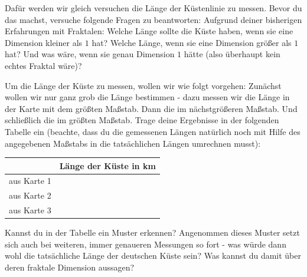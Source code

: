 \documentclass[a4paper,ngerman,12pt]{scrartcl}
\theoremstyle{definition}
\theoremstyle{plain}
\theoremstyle{remark}
\begin{document}
\begin{itemize}
	Dafür werden wir gleich versuchen die Länge der Küstenlinie zu messen. Bevor du das machst, versuche folgende Fragen zu beantworten: Aufgrund deiner bisherigen Erfahrungen mit Fraktalen: Welche Länge sollte die Küste haben, wenn sie eine Dimension kleiner als $1$ hat? Welche Länge, wenn sie eine Dimension größer als $1$ hat? Und was wäre, wenn sie genau Dimension $1$ hätte (also überhaupt kein echtes Fraktal wäre)?
	
	Um die Länge der Küste zu messen, wollen wir wie folgt vorgehen: Zunächst wollen wir nur ganz grob die Länge bestimmen - dazu messen wir die Länge in der Karte mit dem größten Maßstab. Dann die im nächstgrößeren Maßstab. Und schließlich die im größten Maßstab. Trage deine Ergebnisse in der folgenden Tabelle ein (beachte, dass du die gemessenen Längen natürlich noch mit Hilfe des angegebenen Maßstabs in die tatsächlichen Längen umrechnen musst):
	
	\begin{center}
		\renewcommand{\arraystretch}{2}
		\begin{tabular}{l||c}
			& Länge der Küste in \unit{km} \\\hline\hline
			aus Karte 1 & \\\hline
			aus Karte 2 & \\\hline
			aus Karte 3 &
		\end{tabular}
	\end{center}
	
	Kannst du in der Tabelle ein Muster erkennen? Angenommen dieses Muster setzt sich auch bei weiteren, immer genaueren Messungen so fort - was würde dann wohl die tatsächliche Länge der deutschen Küste sein? Was kannst du damit über deren fraktale Dimension aussagen?
\end{itemize}
\end{document}
